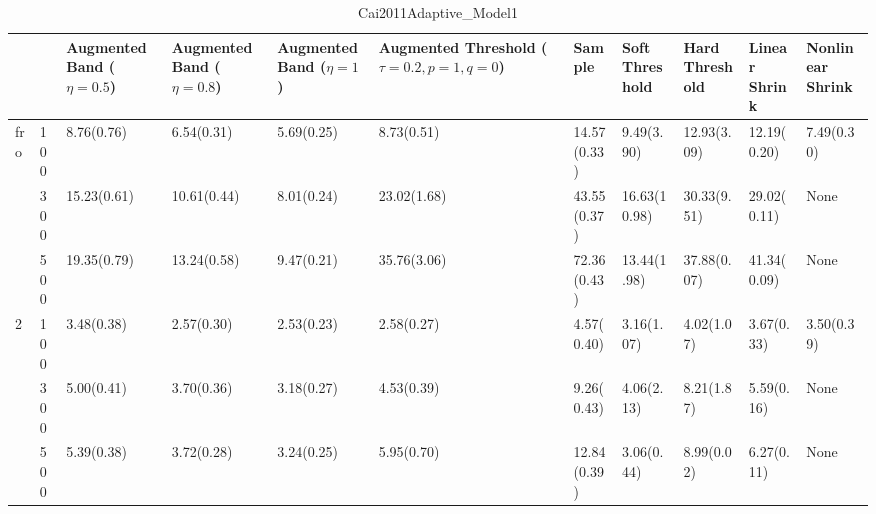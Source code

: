 \begin{table}[htbp]
\centering
\caption{Cai2011Adaptive_Model1}
\label{my label}
\begin{tabular}{ll|p{2cm}p{2cm}p{2cm}p{2cm}p{2cm}p{2cm}p{2cm}p{2cm}p{2cm}}
\toprule
  &     & Augmented Band ($\eta=0.5$) & Augmented Band ($\eta=0.8$) & Augmented Band ($\eta=1$) & Augmented Threshold ($\tau=0.2, p=1, q=0$) &       Sample & Soft Threshold & Hard Threshold & Linear Shrink & Nonlinear Shrink \\
\midrule
fro & 100 &                  8.76(0.76) &                  6.54(0.31) &                5.69(0.25) &                                 8.73(0.51) &  14.57(0.33) &     9.49(3.90) &    12.93(3.09) &   12.19(0.20) &       7.49(0.30) \\
  & 300 &                 15.23(0.61) &                 10.61(0.44) &                8.01(0.24) &                                23.02(1.68) &  43.55(0.37) &   16.63(10.98) &    30.33(9.51) &   29.02(0.11) &             None \\
  & 500 &                 19.35(0.79) &                 13.24(0.58) &                9.47(0.21) &                                35.76(3.06) &  72.36(0.43) &    13.44(1.98) &    37.88(0.07) &   41.34(0.09) &             None \\
2 & 100 &                  3.48(0.38) &                  2.57(0.30) &                2.53(0.23) &                                 2.58(0.27) &   4.57(0.40) &     3.16(1.07) &     4.02(1.07) &    3.67(0.33) &       3.50(0.39) \\
  & 300 &                  5.00(0.41) &                  3.70(0.36) &                3.18(0.27) &                                 4.53(0.39) &   9.26(0.43) &     4.06(2.13) &     8.21(1.87) &    5.59(0.16) &             None \\
  & 500 &                  5.39(0.38) &                  3.72(0.28) &                3.24(0.25) &                                 5.95(0.70) &  12.84(0.39) &     3.06(0.44) &     8.99(0.02) &    6.27(0.11) &             None \\
\bottomrule
\end{tabular}
\end{table}
